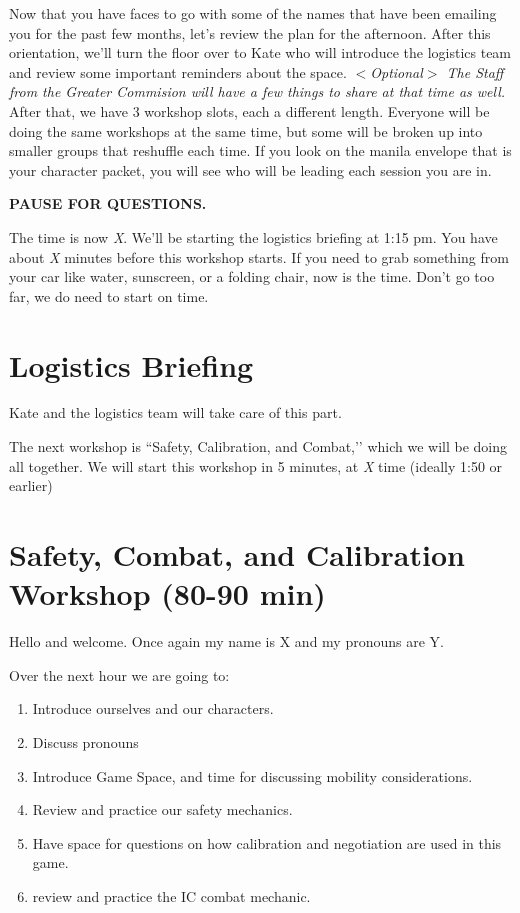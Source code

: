 \documentclass[green]{GL2020}
\begin{document}
Now that you have faces to go with some of the names that have been emailing you for the past few months, let’s review the plan for the afternoon. After this orientation, we’ll turn the floor over to Kate who will introduce the logistics team and review some important reminders about the space. \emph{$<$Optional$>$ The Staff from the Greater Commision will have a few things to share at that time as well.} After that, we have 3 workshop slots, each a different length. Everyone will be doing the same workshops at the same time, but some will be broken up into smaller groups that reshuffle each time. If you look on the manila envelope that is your character packet, you will see who will be leading each session you are in. 

\textbf{PAUSE FOR QUESTIONS.}

The time is now \emph{X}. We'll be starting the logistics briefing at 1:15 pm. You have about \emph{X} minutes before this workshop starts. If you need to grab something from your car like water, sunscreen, or a folding chair, now is the time. Don't go too far, we do need to start on time.

\section*{Logistics Briefing}
Kate and the logistics team will take care of this part. 

The next workshop is ``Safety, Calibration, and Combat,’’ which we will be doing all together. We will start this workshop in 5 minutes, at \emph{X} time (ideally 1:50 or earlier)

\section*{Safety, Combat, and Calibration Workshop (80-90 min)}
Hello and welcome. Once again my name is X and my pronouns are Y.

Over the next hour we are going to:
\begin{enumerate}
	\item Introduce ourselves and our characters.
	\item Discuss pronouns
	\item Introduce Game Space, and time for discussing mobility considerations.
	\item Review and practice our safety mechanics.
	\item Have space for questions on how calibration and negotiation are used in this game.
	\item review and practice the IC combat mechanic.
\end{enumerate}
\end{document}
